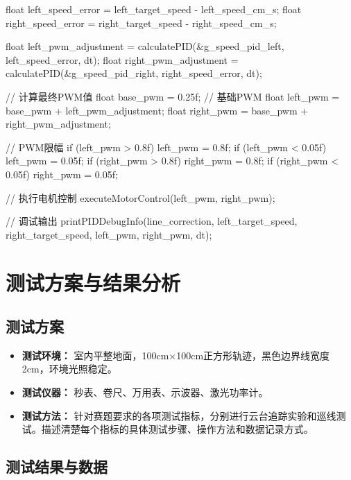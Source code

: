 \documentclass[UTF-8,zihao=-4]{ctexart}
\begin{document}
{{        float left_speed_error = left_target_speed - left_speed_cm_s;
        float right_speed_error = right_target_speed - right_speed_cm_s;
        
        float left_pwm_adjustment = calculatePID(&g_speed_pid_left, left_speed_error, dt);
        float right_pwm_adjustment = calculatePID(&g_speed_pid_right, right_speed_error, dt);
        
        // 计算最终PWM值
        float base_pwm = 0.25f; // 基础PWM
        float left_pwm = base_pwm + left_pwm_adjustment;
        float right_pwm = base_pwm + right_pwm_adjustment;
        
        // PWM限幅
        if (left_pwm > 0.8f) left_pwm = 0.8f;
        if (left_pwm < 0.05f) left_pwm = 0.05f;
        if (right_pwm > 0.8f) right_pwm = 0.8f;
        if (right_pwm < 0.05f) right_pwm = 0.05f;
        
        // 执行电机控制
        executeMotorControl(left_pwm, right_pwm);
        
        // 调试输出
        printPIDDebugInfo(line_correction, left_target_speed, right_target_speed, 
                         left_pwm, right_pwm, dt);
    }
}

\section{测试方案与结果分析}
\subsection{测试方案}
    \begin{itemize}
        \item \textbf{测试环境：} 室内平整地面，100cm×100cm正方形轨迹，黑色边界线宽度2cm，环境光照稳定。
        \item \textbf{测试仪器：} 秒表、卷尺、万用表、示波器、激光功率计。
        \item \textbf{测试方法：} 针对赛题要求的各项测试指标，分别进行云台追踪实验和巡线测试。描述清楚每个指标的具体测试步骤、操作方法和数据记录方式。
    \end{itemize}

\subsection{测试结果与数据}
    
\end{document}

